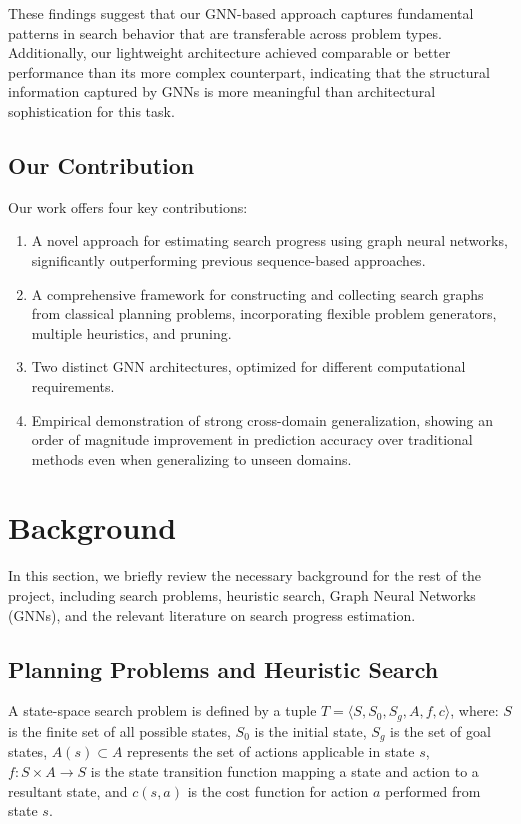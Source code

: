 \documentclass[letterpaper]{article}
\newcommand{\gur}[1]{{\color{teal}{Gur: #1}}}
\begin{document}
These findings suggest that our GNN-based approach captures fundamental patterns in search behavior that are transferable across problem types. Additionally, our lightweight architecture achieved comparable or better performance than its more complex counterpart, indicating that the structural information captured by GNNs is more meaningful than architectural sophistication for this task. \gur{update}

\subsection{Our Contribution}

Our work offers four key contributions:
\begin{enumerate}
    \item A novel approach for estimating search progress using graph neural networks, significantly outperforming previous sequence-based approaches.
    \item A comprehensive framework for constructing and collecting search graphs from classical planning problems, incorporating flexible problem generators, multiple heuristics, and pruning.
    \item Two distinct GNN architectures, optimized for different computational requirements.
    \item Empirical demonstration of strong cross-domain generalization, showing an order of magnitude improvement in prediction accuracy over traditional methods even when generalizing to unseen domains.
\end{enumerate}

\section{Background}

In this section, we briefly review the necessary background for the rest of the project, including search problems, heuristic search, Graph Neural Networks (GNNs), and the relevant literature on search progress estimation.

\subsection{Planning Problems and Heuristic Search}

A state-space search problem is defined by a tuple $T = \langle S, S_0, S_g, A, f, c\rangle$, where: $S$ is the finite set of all possible states, $S_0$ is the initial state, $S_g$ is the set of goal states, $A(s) \subset A$ represents the set of actions applicable in state $s$, $f: S \times A \rightarrow S$ is the state transition function mapping a state and action to a resultant state, and $c(s,a)$ is the cost function for action $a$ performed from state $s$.
\end{document}
